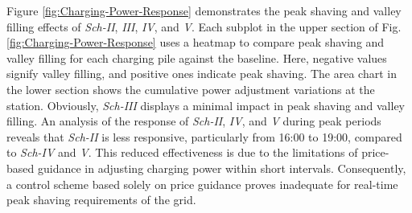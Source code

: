 \documentclass[preprint,12pt]{elsarticle}
\begin{document}

Figure \ref{fig:Charging-Power-Response} demonstrates the peak shaving and valley filling effects of \emph{Sch-II}, \emph{III}, \emph{IV}, and \emph{V}. Each subplot in the upper section of Fig. \ref{fig:Charging-Power-Response} uses a heatmap to compare peak shaving and valley filling for each charging pile against the baseline.  Here, negative values signify valley filling, and positive ones indicate peak shaving.  The area chart in the lower section shows the cumulative power adjustment variations at the station. Obviously, \emph{Sch-III} displays a minimal impact in peak shaving and valley filling.  An analysis of the response of \emph{Sch-II}, \emph{IV}, and \emph{V} during peak periods reveals that \emph{Sch-II} is less responsive, particularly from 16:00 to 19:00, compared to \emph{Sch-IV} and \emph{V}. This reduced effectiveness is due to the limitations of price-based guidance in adjusting charging power within short intervals. Consequently, a control scheme based solely on price guidance proves inadequate for real-time peak shaving requirements of the grid.
\end{document}
